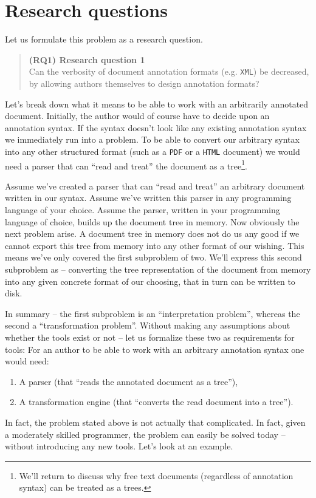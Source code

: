 \documentclass{scrreprt}
\newcommand\researchquestionformat[1]{\begin{quote}#1\end{quote}}
\newcommand\firstresearchquestion{\researchquestionformat{%
  \textbf{(RQ1) Research question 1} \\
  Can the verbosity of document annotation formats (e.g. \texttt{XML}) be decreased, by allowing authors themselves to design annotation formats?%
}}
\begin{document}
\chapter{Research questions}
Let us formulate this problem as a research question.

\firstresearchquestion

Let's break down what it means to be able to work with an arbitrarily annotated document. Initially, the author would of course have to decide upon an annotation syntax. If the syntax doesn't look like any existing annotation syntax we immediately run into a problem. To be able to convert our arbitrary syntax into any other structured format (such as a \texttt{PDF} or a \texttt{HTML} document) we would need a parser that can ``read and treat'' the document as a tree\footnote{ We'll return to discuss why free text documents (regardless of annotation syntax) can be treated as a trees. }. %

Assume we've created a parser that can ``read and treat'' an arbitrary document written in our syntax. Assume we've written this parser in any programming language of your choice. Assume the parser, written in your programming language of choice, builds up the document tree in memory. Now obviously the next problem arise. A document tree in memory does not do us any good if we cannot export this tree from memory into any other format of our wishing. This means we've only covered the first subproblem of two. We'll express this second subproblem as -- converting the tree representation of the document from memory into any given concrete format of our choosing, that in turn can be written to disk.

In summary -- the first subproblem is an ``interpretation problem'', whereas the second a ``transformation problem''. Without making any assumptions about whether the tools exist or not -- let us formalize these two as requirements for tools: For an author to be able to work with an arbitrary annotation syntax one would need:

\begin{enumerate}
\item A parser (that ``reads the annotated document as a tree''),
\item A transformation engine (that ``converts the read document into a tree'').
\end{enumerate}

In fact, the problem stated above is not actually that complicated. In fact, given a moderately skilled programmer, the problem can easily be solved today -- without introducing any new tools. Let's look at an example.
\end{document}

